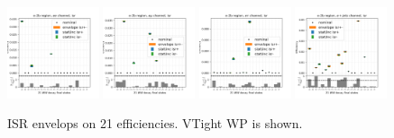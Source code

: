 \begin{figure}
    \includegraphics[width=0.24\textwidth]{chapters/Appendix/sectionTTSyst/figures/afterCorr/icata3_ch0_isr.png}
    \includegraphics[width=0.24\textwidth]{chapters/Appendix/sectionTTSyst/figures/afterCorr/icata3_ch1_isr.png}
    \includegraphics[width=0.24\textwidth]{chapters/Appendix/sectionTTSyst/figures/afterCorr/icata3_ch2_isr.png}
    \includegraphics[width=0.24\textwidth]{chapters/Appendix/sectionTTSyst/figures/afterCorr/icata3_ch3_isr.png}
    
    \caption{ISR envelops on 21 efficiencies. VTight WP is shown.}
    \label{fig:appendix:reweighttt:effAfterCorrISR}
\end{figure}




